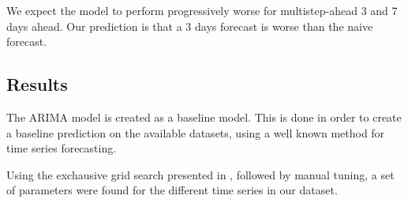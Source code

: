 We expect the model to perform progressively worse for multistep-ahead 3 and 7
days ahead. Our prediction is that a 3 days forecast is worse than the naive forecast.







\subsection{Results}
The ARIMA model is created as a baseline model.
This is done in order to create a baseline prediction on the available datasets, using a well known method for time series forecasting.

Using the exchausive grid search presented in , followed by manual tuning,
a set of parameters were found for the different time series in our dataset.





